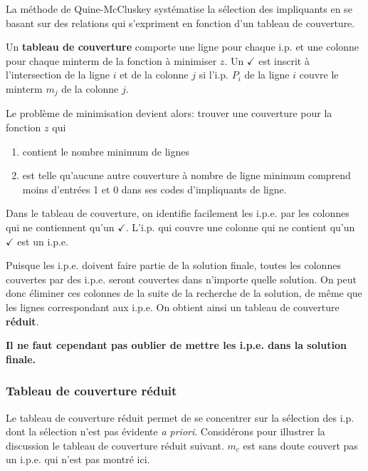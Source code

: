 \documentclass[11pt]{article}
\begin{document}
La méthode de Quine-McCluskey systématise la sélection des impliquants
en se basant sur des relations qui s'expriment en fonction d'un
tableau de couverture.

Un \textbf{tableau de couverture} comporte une ligne pour chaque i.p. et une
colonne pour chaque minterm de la fonction à minimiser \(z\). Un \(\checkmark\) est
inscrit à l'intersection de la ligne \(i\) et de la colonne  \(j\) si
l'i.p.  \(P_i\) de la ligne  \(i\) couvre le minterm  \(m_j\) de la colonne
 \(j\).

Le problème de minimisation devient alors: trouver une couverture pour
la fonction \(z\) qui

\begin{enumerate}
\item contient le nombre minimum de lignes

\item est telle qu'aucune autre couverture à nombre de ligne minimum
comprend moins d'entrées 1 et 0 dans ses codes d'impliquants de
ligne.
\end{enumerate}

Dans le tableau de couverture, on identifie facilement les i.p.e. par
les colonnes qui ne contiennent qu'un \(\checkmark\). L'i.p. qui couvre une colonne
qui ne contient qu'un \(\checkmark\) est un i.p.e.

Puisque les i.p.e. doivent faire partie de la solution finale, toutes
les colonnes couvertes par des i.p.e. seront couvertes dans n'importe
quelle solution. On peut donc éliminer ces colonnes de la suite de la
recherche de la solution, de même que les lignes correspondant aux
i.p.e. On obtient ainsi un tableau de couverture \textbf{réduit}.

\textbf{Il ne faut cependant pas oublier de mettre les i.p.e. dans la solution
finale.}

\subsubsection{Tableau de couverture réduit}
\label{sec:orgd7b06ce}

Le tableau de couverture réduit permet de se concentrer sur la
sélection des i.p. dont la sélection n'est pas évidente \emph{a
priori}. Considérons pour illustrer la discussion le tableau de
couverture réduit suivant. \(m_c\) est sans doute couvert pas un
i.p.e. qui n'est pas montré ici.
\end{document}
